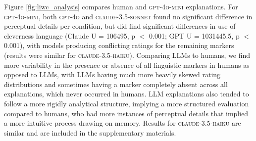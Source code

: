 Figure \ref{fig:liwc_analysis} compares human and \textsc{gpt-4o-mini} explanations. For \textsc{gpt-4o-mini}, both \textsc{gpt-4o} and \textsc{claude-3.5-sonnet} found no significant difference in perceptual details per condition, but did find significant differences in use of cleverness language (Claude U = 106495, p $<$ 0.001; GPT U = 1031445.5, p $<$ 0.001), with models producing conflicting ratings for the remaining markers (results were similar for \textsc{claude-3.5-haiku}). Comparing LLMs to humans, we find more variability in the presence or absence of all linguistic markers in humans as opposed to LLMs, with LLMs having much more heavily skewed rating distributions and sometimes having a marker completely absent across all explanations, which never occurred in humans. LLM explanations also tended to follow a more rigidly analytical structure, implying a more structured evaluation compared to humans, who had more instances of perceptual details that implied a more intuitive process drawing on memory. Results for \textsc{claude-3.5-haiku} are similar and are included in the supplementary materials.


